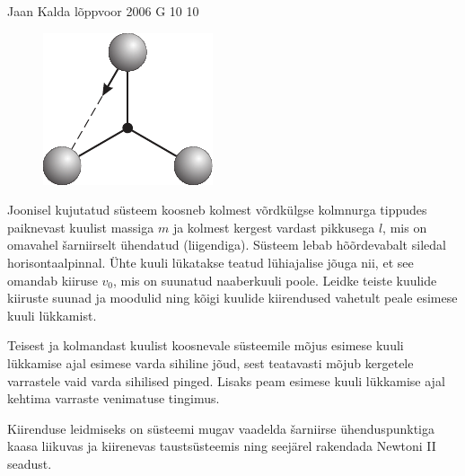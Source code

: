 {Jaan Kalda} %
{lõppvoor} %
{2006} %
{G 10} %
{10} %
{
\ifStatement
\begin{figure}
	\begin{center}
		\vspace{-25pt}
		\includegraphics[width=\linewidth]{2006-v3g-10-yl}
	\end{center}
\end{figure}
Joonisel kujutatud süsteem koosneb kolmest võrdkülgse kolmnurga tippudes paiknevast kuulist massiga $m$ ja kolmest kergest vardast pikkusega $l$, mis on omavahel šarniirselt ühendatud (liigendiga). Süsteem lebab hõõrdevabalt siledal horisontaalpinnal. Ühte kuuli lükatakse teatud lühiajalise jõuga nii, et see omandab kiiruse $v_0$, mis on suunatud naaberkuuli poole. Leidke teiste kuulide kiiruste suunad ja moodulid ning kõigi kuulide kiirendused vahetult peale esimese kuuli lükkamist.
\fi


\ifHint
Teisest ja kolmandast kuulist koosnevale süsteemile mõjus esimese kuuli lükkamise ajal esimese varda sihiline jõud, sest teatavasti mõjub kergetele varrastele vaid varda sihilised pinged. Lisaks peam esimese kuuli lükkamise ajal kehtima varraste venimatuse tingimus.

Kiirenduse leidmiseks on süsteemi mugav vaadelda šarniirse ühenduspunktiga kaasa liikuvas ja kiirenevas taustsüsteemis ning seejärel rakendada Newtoni II seadust.
\fi


}
